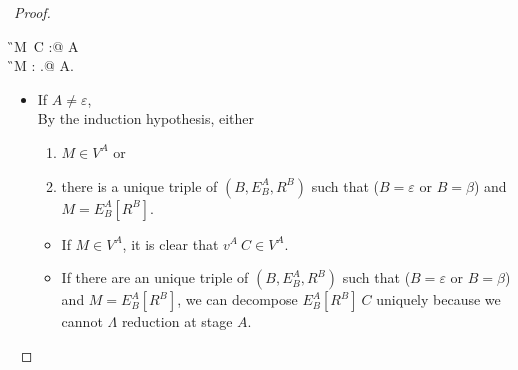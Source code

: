 \begin{proof}
{\begin{rneqncase}{\TIns}{
                \G \V M\ C : @ A\\
                  \G \V M : \forall\alpha.\tau @ A.
            }
\begin{itemize}
                \item If $ A \neq \varepsilon $,\\
                    By the induction hypothesis, either
                    \begin{enumerate}
                        \item $ M \in V^A$ or
                        \item there is a unique triple of $(B, E^A_B, R^B)$ such that ($B = \varepsilon$ or $B = \beta$) and $M = E^A_B[R^B]$.
                    \end{enumerate}
                    \begin{itemize}
                        \item If $ M \in V^A$,
                            it is clear that $v^A\ C \in V^A$.
                        \item If there are an unique triple of $(B, E^A_B, R^B)$ such that ($B = \varepsilon$ or $B = \beta$) and $M = E^A_B[R^B]$,
                            we can decompose $E^A_B[R^B]\ C$ uniquely because we cannot $\Lambda$ reduction at stage $A$.
                    \end{itemize}
            \end{itemize}
        \end{rneqncase}
        }

\end{proof}
